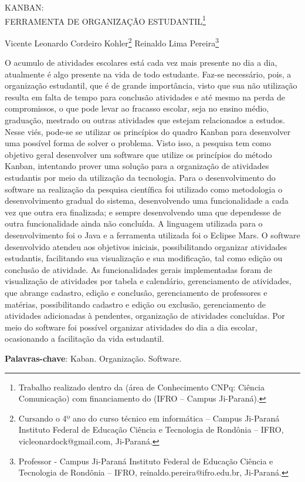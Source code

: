 \documentclass[article,12pt,onesidea,4paper,english,brazil]{abntex2}
\begin{document}
	
	
	\frenchspacing 
	
	\begin{center}
		\LARGE KANBAN: \\FERRAMENTA DE ORGANIZAÇÃO ESTUDANTIL\footnote{Trabalho realizado dentro da (área de Conhecimento CNPq: Ciência Comunicação) com financiamento do (IFRO – Campus Ji-Paraná).}
		
		\normalsize
	Vicente Leonardo Cordeiro Kohler\footnote{Cursando o 4º ano do curso técnico em informática – Campus Ji-Paraná Instituto Federal de
		Educação Ciência e Tecnologia de Rondônia – IFRO, vicleonardock@gmail.com, Ji-Paraná.} 
	Reinaldo Lima Pereira\footnote{Professor - Campus Ji-Paraná Instituto Federal de Educação Ciência e Tecnologia de Rondônia –
		IFRO, reinaldo.pereira@ifro.edu.br, Ji-Paraná.} 
	\end{center}
	
	\noindent O acumulo de atividades escolares está cada vez mais presente no dia a dia,
	atualmente é algo presente na vida de todo estudante. Faz-se necessário, pois, a
	organização estudantil, que é de grande importância, visto que sua não utilização
	resulta em falta de tempo para conclusão atividades e até mesmo na perda de
	compromissos, o que pode levar ao fracasso escolar, seja no ensino médio,
	graduação, mestrado ou outras atividades que estejam relacionados a estudos.
	Nesse viés, pode-se se utilizar os princípios do quadro Kanban para desenvolver
	uma possível forma de solver o problema. Visto isso, a pesquisa tem como objetivo
	geral desenvolver um software que utilize os princípios do método Kanban,
	intentando prover uma solução para a organização de atividades estudantis por meio
	da utilização da tecnologia. Para o desenvolvimento do software na realização da
	pesquisa científica foi utilizado como metodologia o desenvolvimento gradual do
	sistema, desenvolvendo uma funcionalidade a cada vez que outra era finalizada; e
	sempre desenvolvendo uma que dependesse de outra funcionalidade ainda não
	concluída. A linguagem utilizada para o desenvolvimento foi o Java e a ferramenta
	utilizada foi o Eclipse Mars. O software desenvolvido atendeu aos objetivos iniciais,
	possibilitando organizar atividades estudantis, facilitando sua visualização e sua
	modificação, tal como edição ou conclusão de atividade. As funcionalidades gerais
	implementadas foram de visualização de atividades por tabela e calendário,
	gerenciamento de atividades, que abrange cadastro, edição e conclusão,
	gerenciamento de professores e matérias, possibilitando cadastro e edição ou
	exclusão, gerenciamento de atividades adicionadas à pendentes, organização de
	atividades concluídas. Por meio do software foi possível organizar atividades do dia
	a dia escolar, ocasionando a facilitação da vida estudantil.
	
	\vspace{\onelineskip}
	
	\noindent
	\textbf{Palavras-chave}: Kaban. Organização. Software.
	
\end{document}
